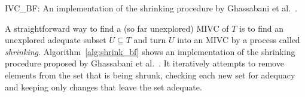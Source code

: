 %
%
%
%
%

\begin{algorithm}[!t]
\label{alg:shrink_bf}

\caption{IVC\_BF: An implementation of the shrinking procedure by Ghassabani et al.~\cite{single-ivc}. }
\end{algorithm}


A straightforward way to find a (so far unexplored) MIVC of $T$ is to find an unexplored adequate subset $U \subseteq T$ and turn $U$  into an MIVC by a process called \emph{shrinking}. Algorithm~\ref{alg:shrink_bf} shows an implementation of the shrinking procedure proposed by Ghassabani et al.~\cite{single-ivc}.
It iteratively attempts to remove elements from the set that is being
shrunk, checking each new set for adequacy and keeping only changes that
leave the set adequate.

